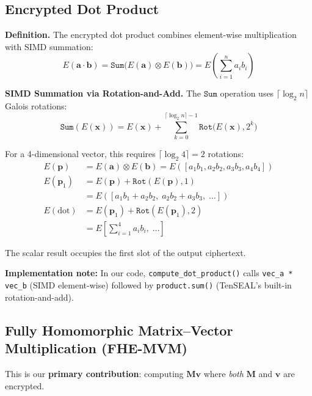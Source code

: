 \documentclass[conference,12pt]{IEEEtran}
\begin{document}
\subsection{Encrypted Dot Product}
\label{sec:dotprod}

\noindent\textbf{Definition.} The encrypted dot product combines element-wise multiplication with SIMD summation:
\begin{equation}
    E(\mathbf{a} \cdot \mathbf{b}) = \texttt{Sum}\big(E(\mathbf{a}) \otimes E(\mathbf{b})\big) = E\left(\sum_{i=1}^{n} a_i b_i\right)
    \label{eq:dotprod}
\end{equation}

\noindent\textbf{SIMD Summation via Rotation-and-Add.} The $\texttt{Sum}$ operation uses $\lceil \log_2 n \rceil$ Galois rotations:
\begin{equation}
    \texttt{Sum}(E(\mathbf{x})) = E(\mathbf{x}) + \sum_{k=0}^{\lceil \log_2 n \rceil - 1} \texttt{Rot}\big(E(\mathbf{x}), 2^k\big)
    \label{eq:simd_sum}
\end{equation}

For a 4-dimensional vector, this requires $\lceil \log_2 4 \rceil = 2$ rotations:
\begin{align}
    E(\mathbf{p}) &= E(\mathbf{a}) \otimes E(\mathbf{b}) = E([a_1b_1, a_2b_2, a_3b_3, a_4b_4]) \\
    E(\mathbf{p}_1) &= E(\mathbf{p}) + \texttt{Rot}(E(\mathbf{p}), 1) \\
    &= E([a_1b_1 + a_2b_2, \; a_2b_2 + a_3b_3, \; \ldots]) \\
    E(\text{dot}) &= E(\mathbf{p}_1) + \texttt{Rot}(E(\mathbf{p}_1), 2) \\
    &= E\left[\sum_{i=1}^{4} a_i b_i, \; \ldots\right]
\end{align}

The scalar result occupies the first slot of the output ciphertext.

\noindent\textbf{Implementation note:} In our code, \texttt{compute\_dot\_product()} calls \texttt{vec\_a * vec\_b} (SIMD element-wise) followed by \texttt{product.sum()} (TenSEAL's built-in rotation-and-add).

\subsection{Fully Homomorphic Matrix--Vector Multiplication (FHE-MVM)}
\label{sec:fhe_matvec}

This is our \textbf{primary contribution}: computing $\mathbf{Mv}$ where \emph{both} $\mathbf{M}$ and $\mathbf{v}$ are encrypted.
\end{document}

